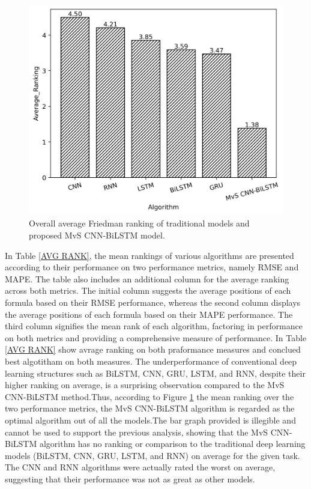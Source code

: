 \documentclass[a4paper,fleqn]{cas-dc}
\begin{document}
  \begin{figure}[h!]
    \centering
    \includegraphics[scale=0.7]{img/avg_Rank_plot}
    \caption{Overall average Friedman ranking of traditional models and proposed MvS CNN-BiLSTM model.}
    \label{avg_Rank_plot}
  \end{figure}
  In Table \ref{AVG RANK}, the mean rankings of various algorithms are presented according to their performance on two performance metrics, namely RMSE and MAPE. The table also includes an additional column for the average ranking across both metrics. The initial column suggests the average positions of each formula based on their RMSE performance, whereas the second column displays the average positions of each formula based on their MAPE performance. The third column signifies the mean rank of each algorithm, factoring in performance on both metrics and providing a comprehensive measure of performance. In Table \ref{AVG RANK} show avrage ranking on both praformance measures and conclued best algotitham on both measures. The underperformance of conventional deep learning structures such as BiLSTM, CNN, GRU, LSTM, and RNN, despite their higher ranking on average, is a surprising observation compared to the MvS CNN-BiLSTM method.Thus, according to Figure \ref{avg_Rank_plot} the mean ranking over the two performance metrics, the MvS CNN-BiLSTM algorithm is regarded as the optimal algorithm out of all the models.The bar graph provided is illegible and cannot be used to support the previous analysis, showing that the MvS CNN-BiLSTM algorithm has no ranking or comparison to the traditional deep learning models (BiLSTM, CNN, GRU, LSTM, and RNN) on average for the given task. The CNN and RNN algorithms were actually rated the worst on average, suggesting that their performance was not as great as other models.
\end{document}
